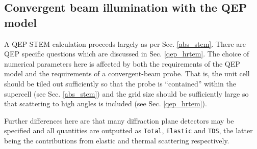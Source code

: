 \documentclass[12pt,a4paper]{article}
\begin{document}
\subsection{Convergent beam illumination with the QEP model}

A QEP STEM calculation proceeds largely as per Sec. \ref{abs_stem}.
There are QEP specific questions which are discussed in Sec. \ref{qep_hrtem}.
The choice of numerical parameters here is affected by both the requirements of the QEP model and the requirements of a convergent-beam probe.
That is, the unit cell should be tiled out sufficiently so that the probe is ``contained'' within the supercell (see Sec. \ref{abs_stem}) and the grid size should be sufficiently large so that scattering to high angles is included (see Sec. \ref{qep_hrtem}).

Further differences here are that many diffraction plane detectors may be specified and all quantities are outputted as \verb|Total|, \verb|Elastic| and \verb|TDS|, the latter being the contributions from elastic and thermal scattering respectively.



\end{document}
